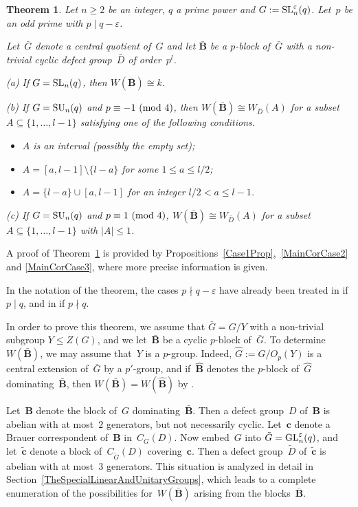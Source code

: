 \documentclass[12pt]{amsart}
\newcommand{\bB}{{\mathbf{B}}}
\newcommand{\bc}{{\mathbf{c}}}
\def\GL{ \text{\rm GL} }
\def\SL{ \text{\rm SL} }
\def\SU{ \text{\rm SU} }
\newtheorem{thm}{Theorem}[section]
\theoremstyle{theorem}
\theoremstyle{definition}
\theoremstyle{remark}
\begin{document}
\begin{thm}
\label{MainTheoremSLNSUNI}
Let $n \geq 2$ be an integer, $q$ a prime power and
$G := \SL_n^\varepsilon( q )$. Let~$p$ be an odd prime with
$p \mid q - \varepsilon$.

Let~$\bar{G}$ denote a central quotient of~$G$ and let $\bar{\bB}$ be a
$p$-block of~$\bar{G}$ with a non-trivial cyclic defect group~$\bar{D}$ of 
order~$p^{l}$.

{\rm (a)} If $G = \SL_n( q )$, then $W( \bar{\bB} ) \cong k$. 

{\rm (b)} If $G = \SU_n(q)$ and 
$p \equiv -1\,\,(\mbox{\rm mod}\,\,4)$, then
$W( \bar{\bB} ) \cong W_{\bar{D}}( A )$ for a subset 
$A \subseteq \{ 1, \ldots , l - 1 \}$ satisfying one of the following conditions.
\begin{itemize}
\item[(i)] $A$ is an interval (possibly the empty set);  
\item[(ii)] $A = [a, l-1] \setminus \{ l - a \}$ for some $1 \leq a \leq l/2$;
\item[(iii)] $A = \{ l - a \} \cup [a, l - 1]$ for an integer $l/2 < a \leq l - 1$.
\end{itemize}

{\rm (c)} If $G = \SU_n(q)$ and $p \equiv 1\,\,(\mbox{\rm mod}\,\,4)$, 
$W( \bar{\bB} ) \cong W_{\bar{D}}( A )$ for a subset
$A \subseteq \{ 1, \ldots , l - 1 \}$ with $|A| \leq 1$. \hfill{\textsquare}
\end{thm}

A proof of Theorem~\ref{MainTheoremSLNSUNI} is provided by
Propositions~\ref{Case1Prop},~\ref{MainCorCase2} and \ref{MainCorCase3}, where 
more precise information is given.

In the notation of the theorem, the cases $p \nmid q - \varepsilon$ have already 
been treated in \cite[Proposition~$6.3$]{HL24} if $p \mid q$, and in 
\cite[Remark~$4.2.3$]{HL25} if $p \nmid q$.

In order to prove this theorem, we assume that $\bar{G} = G/Y$ with a 
non-trivial subgroup $Y \leq Z( G )$, and we let~$\bar{\bB}$ be a cyclic 
$p$-block of~$\bar{G}$. To determine~$W( \bar{\bB} )$, we may assume
that~$Y$ is a $p$-group. Indeed, $\hat{G} := G/O_p(Y)$ is a central extension 
of~$\bar{G}$ by a $p'$-group, and if~$\hat{\bB}$ denotes the $p$-block 
of~$\hat{G}$ dominating~$\bar{\bB}$, then $W( \bar{\bB} ) = W( \hat{\bB} )$ 
by \cite[Lemma~$4.1$]{HL24}.

Let~$\bB$ denote the block of~$G$ dominating~$\bar{\bB}$. 
Then a defect group~$D$ of~$\bB$ is abelian with at most~$2$ generators, but
not necessarily cyclic. Let~$\bc$ denote a Brauer correspondent of~$\bB$ 
in~$C_G(D)$. Now embed~$G$ into $\tilde{G} = \GL^{\varepsilon}_n( q )$, and 
let~$\tilde{\bc}$ denote a block of~$C_{\tilde{G}}( D )$ covering~$\bc$.
Then a defect group~$\tilde{D}$ of~$\tilde{\bc}$ 
is abelian with at most~$3$ generators. This situation is analyzed in detail in 
Section~\ref{TheSpecialLinearAndUnitaryGroups}, which leads to a complete
enumeration of the possibilities for~$W( \bar{\bB} )$ arising from the
blocks~$\bar{\bB}$.
\end{document}
